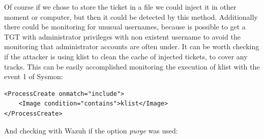 Of course if we chose to store the ticket in a file we could inject it in other moment or computer, but then it could be detected by this method.
\linej
\linej
Additionally there could be monitoring for unusual usernames, because is possible to get a TGT with administrator privileges with non existent username to avoid the monitoring that administrator accounts are often under.
\linej
\linej
It can be worth checking if the attacker is using klist to clean the cache of injected tickets, to cover any tracks. This can be easily accomplished monitoring the execution of klist with the event 1 of Sysmon:
\begin{lstlisting}[style=xml]
<ProcessCreate onmatch="include">
	<Image condition="contains">klist</Image>
</ProcessCreate>
\end{lstlisting}
\linej
And checking with Wazuh if the option \textit{purge} was used:


